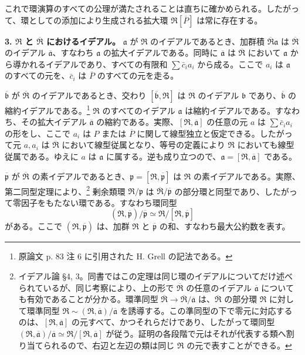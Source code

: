\documentclass[11pt]{article}
\begin{document}
これで環演算のすべての公理が満たされることは直ちに確かめられる。したがって、環としての添加により生成される拡大環 $\mathfrak R[\overline P]$ は常に存在する。

\textbf{3. $\mathfrak R$ と $\overline{\mathfrak R}$ におけるイデアル。} $\mathfrak a$ が $\mathfrak R$ のイデアルであるとき、加群積 $\overline{\mathfrak R}\mathfrak a$ は $\overline{\mathfrak R}$ のイデアル $\overline{\mathfrak a}$、すなわち $\mathfrak a$ の拡大イデアルである。同時に $\overline{\mathfrak a}$ は $\overline{\mathfrak R}$ において $\mathfrak a$ から導かれるイデアルであり、すべての有限和 $\sum \bar c_i a_i$ から成る。ここで $a_i$ は $\mathfrak a$ のすべての元を、$\bar c_i$ は $\overline P$ のすべての元を走る。

$\overline{\mathfrak b}$ が $\overline{\mathfrak R}$ のイデアルであるとき、交わり $[\overline{\mathfrak b},\mathfrak R]$ は $\mathfrak R$ のイデアル $\mathfrak b$ であり、$\overline{\mathfrak b}$ の縮約イデアルである。\footnote{原論文 p. 83 注 6 に引用された H. Grell の記法である。} $\mathfrak R$ のすべてのイデアル $\mathfrak a$ は縮約イデアルである。すなわち、その拡大イデアル $\overline{\mathfrak a}$ の縮約である。実際、$[\mathfrak R,\overline{\mathfrak a}]$ の任意の元 $a$ は $\sum\bar c_i a_i$ の形をし、ここで $a_i$ は $P$ または $\overline P$ に関して線型独立と仮定できる。したがって元 $a,a_i$ は $\overline{\mathfrak R}$ において線型従属となり、等号の定義により $\mathfrak R$ においても線型従属である。ゆえに $a$ は $\mathfrak a$ に属する。逆も成り立つので、$\mathfrak a=[\mathfrak R,\overline{\mathfrak a}]$ である。

$\overline{\mathfrak p}$ が $\overline{\mathfrak R}$ の素イデアルであるとき、$\mathfrak p=[\mathfrak R,\overline{\mathfrak p}]$ は $\mathfrak R$ の素イデアルである。実際、第二同型定理により、\footnote{イデアル論 \S 4, 3。同書ではこの定理は同じ環のイデアルについてだけ述べられているが、同じ考察により、上の形で $\overline{\mathfrak R}$ の任意のイデアル $\overline{\mathfrak a}$ についても有効であることが分かる。環準同型 $\overline{\mathfrak R}\to\overline{\mathfrak R}/\overline{\mathfrak a}$ は、$\overline{\mathfrak R}$ の部分環 $\mathfrak R$ に対して環準同型 $\mathfrak R\sim(\mathfrak R,\overline{\mathfrak a})/\overline{\mathfrak a}$ を誘導する。この準同型の下で零元に対応するのは、$[\mathfrak R,\overline{\mathfrak a}]$ の元すべて、かつそれらだけであり、したがって環同型 $(\mathfrak R,\overline{\mathfrak a})/\overline{\mathfrak a}\simeq \mathfrak R/[\mathfrak R,\overline{\mathfrak a}]$ が従う。証明の各段階で元はそれが代表する類へ割り当てられるので、右辺と左辺の類は同じ $\mathfrak R$ の元で表すことができる。} 剰余類環 $\mathfrak R/\mathfrak p$ は $\overline{\mathfrak R}/\overline{\mathfrak p}$ の部分環と同型であり、したがって零因子をもたない環である。すなわち環同型
\[
   (\mathfrak R,\overline{\mathfrak p})/\overline{\mathfrak p}
   \simeq \mathfrak R/[\mathfrak R,\overline{\mathfrak p}]
\]
がある。ここで $(\mathfrak R,\overline{\mathfrak p})$ は、加群 $\mathfrak R$ と $\overline{\mathfrak p}$ の和、すなわち最大公約数を表す。
\end{document}
